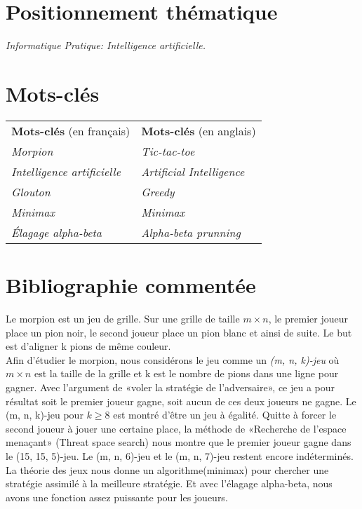 \documentclass[12pt,a4paper]{article}
\begin{document}
\flushleft
\section*{\bfseries Positionnement thématique}

\hspace*{7mm}\textit{Informatique Pratique: Intelligence artificielle.}

\section*{\bfseries Mots-clés}

\begin{tabular}{l l}
    {\bfseries Mots-clés} (en français) & {\bfseries Mots-clés} (en anglais)\\
    \textit{Morpion}& \textit{Tic-tac-toe}\\
    \textit{Intelligence artificielle} & \textit{Artificial Intelligence}\\
    \textit{Glouton} & \textit{Greedy}\\
    \textit{Minimax} & \textit{Minimax}\\
    \textit{Élagage alpha-beta} & \textit{Alpha-beta prunning}
\end{tabular}

\section*{\bfseries Bibliographie commentée}

\hspace*{7mm}Le morpion est un jeu de grille. Sur une grille de taille $m \times n$, le premier joueur place un pion noir, le second joueur place un pion blanc et ainsi de suite. Le but est d'aligner k pions de même couleur.\\
\hspace*{7mm}Afin d'étudier le morpion, nous considérons le jeu comme un \textit{(m, n, k)-jeu} où $m\times n$ est la taille de la grille et k est le nombre de pions dans une ligne pour gagner. Avec l'argument de «voler la stratégie de l'adversaire», ce jeu a pour résultat soit le premier joueur gagne, soit aucun de ces deux joueurs ne gagne\cite{steal}. Le (m, n, k)-jeu pour $k\ge 8$ est montré d'être un jeu à égalité\cite{9-win, 8-win}. Quitte à forcer le second joueur à jouer une certaine place, la méthode de «Recherche de l'espace menaçant» (Threat space search) nous montre que le premier joueur gagne dans le (15, 15, 5)-jeu.\cite{Threat} Le (m, n, 6)-jeu et le (m, n, 7)-jeu restent encore indéterminés\cite{67-win}. La théorie des jeux nous donne un algorithme(minimax) pour chercher une stratégie assimilé à la meilleure stratégie\cite{minimax}. Et avec l'élagage alpha-beta, nous avons une fonction assez puissante pour les joueurs\cite{alpha-beta}.  
\newpage 
\end{document}
